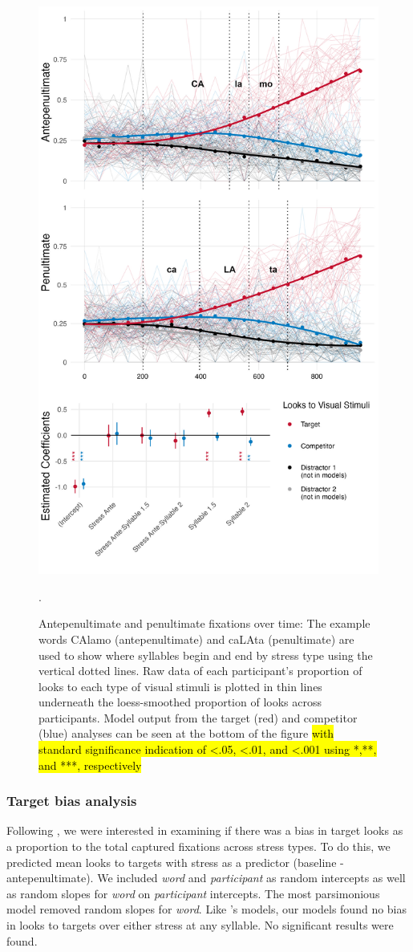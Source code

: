 \begin{figure}[H]
  \centering
  \includegraphics[width=0.6\linewidth]{visuals/pen_vs_anti_pen_id_combo.jpeg} %
  \caption{Antepenultimate and penultimate fixations over time: The example words CAlamo (antepenultimate) and caLAta (penultimate) are used to show where syllables begin and end by stress type using the vertical dotted lines. Raw data of each participant's proportion of looks to each type of visual stimuli is plotted in thin lines underneath the loess-smoothed proportion of looks across participants. Model output from the target (red) and competitor (blue) analyses can be seen at the bottom of the figure \hl{with standard significance indication of \textless .05, \textless .01, and \textless .001 using *,**, and ***, respectively}}. 
  \label{fig:raw_pen_vs_anti}
\end{figure}

\subsubsection{Target bias analysis}

Following \cite{Sulpizio_McQueen_2012}, we were interested in examining if there was a bias in target looks as a proportion to the total captured fixations across stress types. To do this, we predicted mean looks to targets with stress as a predictor (baseline - antepenultimate). We included \textit{word} and \textit{participant} as random intercepts as well as random slopes for \textit{word} on \textit{participant} intercepts. The most parsimonious model removed random slopes for \textit{word}. Like \cite{Sulpizio_McQueen_2012}'s models, our models found no bias in looks to targets over either stress at any syllable. No significant results were found.   

